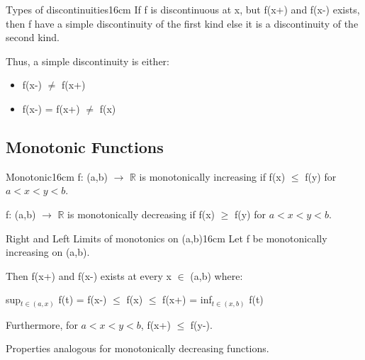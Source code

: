     \vspace{0.5cm}



    \begin{definition}{Types of discontinuities}{16cm}
        \small
        If f is discontinuous at x, but f(x+) and f(x-) exists,
        then f have a simple discontinuity of the first kind else
        it is a discontinuity of the second kind.

        Thus, a {\color{lblue} simple discontinuity} is either:

        \begin{itemize}[leftmargin=1cm, itemsep=0.1cm]
            \item f(x-) $\not = $ f(x+)
            
            \item f(x-) = f(x+) $\not =$ f(x) 
        \end{itemize}
    \end{definition}

    \vspace{0.5cm}





\subsection{ Monotonic Functions }

    \begin{definition}{Monotonic}{16cm}
        \small
        f: (a,b) $\rightarrow$ $\mathbb{R}$ is monotonically increasing
        if f(x) $\leq$ f(y) for $a < x < y < b$.

        f: (a,b) $\rightarrow$ $\mathbb{R}$ is monotonically decreasing
        if f(x) $\geq$ f(y) for $a < x < y < b$.        
    \end{definition}

    \vspace{0.5cm}



    \begin{wtheorem}{Right and Left Limits of monotonics on (a,b)}{16cm}
        Let f be monotonically increasing on (a,b).

        Then f(x+) and f(x-) exists at every x $\in$ (a,b) where:

        \hspace{1cm}
        sup$_{t \in (a,x)}$ f(t)
        = f(x-)
        $\leq$ f(x)
        $\leq$ f(x+)
        = inf$_{t \in (x,b)}$ f(t)

        Furthermore, for $a < x < y < b$, f(x+) $\leq$ f(y-).

        Properties analogous for monotonically decreasing functions.
    \end{wtheorem}

